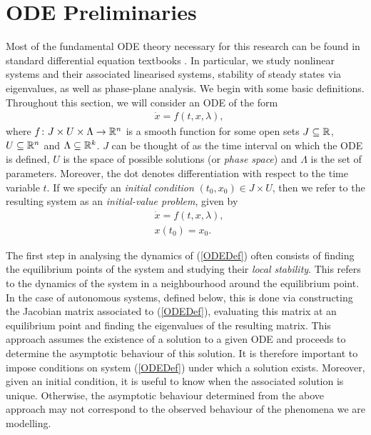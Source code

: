 \documentclass[12pt]{UOthesis}
\theoremstyle{remarkstyle}
\begin{document}
\section{ODE Preliminaries}
\label{SectionOdePrelim}
Most of the fundamental ODE theory necessary for this research can be found in standard differential equation textbooks \cite{Chicone}. In particular, we study nonlinear systems and their associated linearised systems, stability of steady states via eigenvalues, as well as phase-plane analysis. We begin with some basic definitions.\\

Throughout this section, we will consider an ODE of the form
\begin{equation}
	\begin{split}
		&\dot{x}=f(t,x,\lambda),
	\end{split}
	\label{ODEDef}
\end{equation}
where $f\colon J\times U\times \Lambda\rightarrow \mathbb R^n$ is a smooth function for some open sets $J\subseteq \mathbb R$, $U\subseteq \mathbb R^n$ and $\Lambda\subseteq \mathbb R^k$. $J$ can be thought of as the time interval on which the ODE is defined, $U$ is the space of possible solutions (or \textit{phase space}) and $\Lambda$ is the set of parameters. Moreover, the dot denotes differentiation with respect to the time variable $t$. If we specify an \textit{initial condition} $(t_0,x_0)\in J\times U$, then we refer to the resulting system as an \textit{initial-value problem}, given by
\begin{equation}
	\begin{split}
		&\dot{x}=f(t,x,\lambda),\\
		&x(t_0)=x_0.
		\end{split}
	\label{IVPDef}
\end{equation}

The first step in analysing the dynamics of (\ref{ODEDef}) often consists of finding the equilibrium points of the system and studying their \textit{local stability}. This refers to the dynamics of the system in a neighbourhood around the equilibrium point. In the case of autonomous systems, defined below, this is done via constructing the Jacobian matrix associated to (\ref{ODEDef}), evaluating this matrix at an equilibrium point and finding the eigenvalues of the resulting matrix. This approach assumes the existence of a solution to a given ODE and proceeds to determine the asymptotic behaviour of this solution. It is therefore important to impose conditions on system (\ref{ODEDef}) under which a solution exists. Moreover, given an initial condition, it is useful to know when the associated solution is unique. Otherwise, the asymptotic behaviour determined from the above approach may not correspond to the observed behaviour of the phenomena we are modelling.\\
\end{document}
